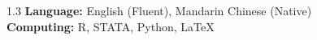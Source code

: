 \begin{spacing}{1.3}
\textbf{Language:} English (Fluent), Mandarin Chinese (Native) \\
\textbf{Computing:} R, STATA, Python, \LaTeX \\
\end{spacing}
